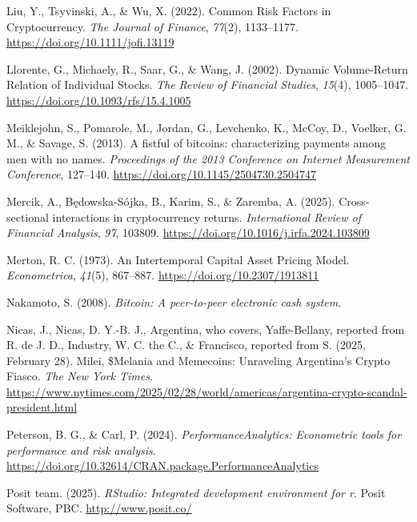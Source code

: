 \documentclass[
  12pt,
  a4paper,
  openany]{scrbook}
\newlength{\cslhangindent}
\newenvironment{CSLReferences}[2] %
 {\begin{list}{}{%
  \setlength{\itemindent}{0pt}
  \setlength{\leftmargin}{0pt}
  \setlength{\parsep}{0pt}
  \ifodd #1
   \setlength{\leftmargin}{\cslhangindent}
   \setlength{\itemindent}{-1\cslhangindent}
  \fi
  \setlength{\itemsep}{#2\baselineskip}}}
 {\end{list}}
\begin{document}
\begin{CSLReferences}{1}{0}
Liu, Y., Tsyvinski, A., \& Wu, X. (2022). Common Risk Factors in
Cryptocurrency. \emph{The Journal of Finance}, \emph{77}(2), 1133--1177.
\url{https://doi.org/10.1111/jofi.13119}

Llorente, G., Michaely, R., Saar, G., \& Wang, J. (2002). Dynamic
Volume-Return Relation of Individual Stocks. \emph{The Review of
Financial Studies}, \emph{15}(4), 1005--1047.
\url{https://doi.org/10.1093/rfs/15.4.1005}

Meiklejohn, S., Pomarole, M., Jordan, G., Levchenko, K., McCoy, D.,
Voelker, G. M., \& Savage, S. (2013). A fistful of bitcoins:
characterizing payments among men with no names. \emph{Proceedings of
the 2013 Conference on Internet Measurement Conference}, 127--140.
\url{https://doi.org/10.1145/2504730.2504747}

Mercik, A., Będowska-Sójka, B., Karim, S., \& Zaremba, A. (2025).
Cross-sectional interactions in cryptocurrency returns.
\emph{International Review of Financial Analysis}, \emph{97}, 103809.
\url{https://doi.org/10.1016/j.irfa.2024.103809}

Merton, R. C. (1973). An Intertemporal Capital Asset Pricing Model.
\emph{Econometrica}, \emph{41}(5), 867--887.
\url{https://doi.org/10.2307/1913811}

Nakamoto, S. (2008). \emph{Bitcoin: A peer-to-peer electronic cash
system}.

Nicas, J., Nicas, D. Y.-B. J., Argentina, who covers, Yaffe-Bellany,
reported from R. de J. D., Industry, W. C. the C., \& Francisco,
reported from S. (2025, February 28). Milei, \$Melania and Memecoins:
Unraveling Argentina's Crypto Fiasco. \emph{The New York Times}.
\url{https://www.nytimes.com/2025/02/28/world/americas/argentina-crypto-scandal-president.html}

Peterson, B. G., \& Carl, P. (2024). \emph{{PerformanceAnalytics}:
Econometric tools for performance and risk analysis}.
\url{https://doi.org/10.32614/CRAN.package.PerformanceAnalytics}

Posit team. (2025). \emph{{RStudio}: Integrated development environment
for r}. Posit Software, PBC. \url{http://www.posit.co/}


\end{CSLReferences}
\end{document}
